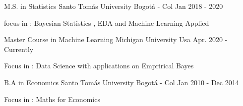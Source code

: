 

\begin{cventries}

  \cventry
    {M.S. in Statistics} %
    {Santo Tomás University} %
    {Bogotá - Col} %
    {Jan 2018 - 2020 } %
    {
      \begin{cvitems} %
        \item {focus in : Bayesian Statistics , EDA and Machine Learning Applied }
      \end{cvitems}
    }

  \cventry
    {Master Course in  Machine Learning} %
    {Michigan University} %
    {Usa} %
    {Apr. 2020 - Currently } %
    {
      \begin{cvitems} %
        \item {Focus in : Data Science with applications on Emprirical Bayes}
      \end{cvitems}
    }


  \cventry
    {B.A in Economics} %
    {Santo Tomás University} %
    {Bogotá - Col} %
    {Jan 2010 - Dec 2014} %
    {
      \begin{cvitems} %
        \item {Focus in : Maths for Economics }
      \end{cvitems}
    }

\end{cventries}
